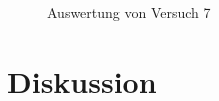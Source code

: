 \documentclass[12pt,a4paper,titlepage,headinclude,bibtotoc]{scrartcl}
\begin{document}
\begin{figure}[h]
\centering
{}
\caption{Auswertung von Versuch 7}
\label{fig:aus7}
\end{figure}

\section{Diskussion}
\label{sec:diskussion}



\end{document}
